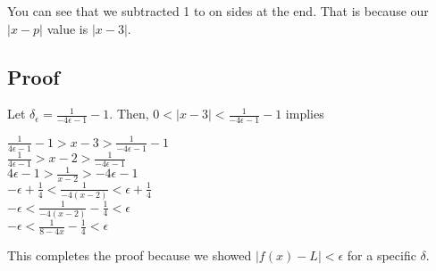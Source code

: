 \documentclass{article}
\newcommand\abs[1]{\left|#1\right|}
\begin{document}
\begin{flushleft}
\begin{enumerate}[(a)]
You can see that we subtracted 1 to on sides at the end. That is because our $\abs{x-p}$ value is $\abs{x-3}$. \\

\subsection*{Proof}

Let $\delta_\epsilon = \frac{1}{-4\epsilon - 1} - 1$. Then, $0 < \abs{x-3} < \frac{1}{-4\epsilon - 1} - 1$ implies \\
\begin{center}
\vspace{.2cm}
$\frac{1}{4\epsilon - 1} - 1 > x - 3 > \frac{1}{-4\epsilon - 1} - 1$ \\
\vspace{.2cm}
$\frac{1}{4\epsilon- 1} > x - 2 > \frac{1}{-4\epsilon - 1}$ \\
\vspace{.2cm}
$4\epsilon - 1 > \frac{1}{x - 2} > -4\epsilon - 1$ \\
\vspace{.2cm}
$-\epsilon + \frac{1}{4} < \frac{1}{-4(x-2)} < \epsilon + \frac{1}{4}$ \\
\vspace{.2cm}
$-\epsilon < \frac{1}{-4(x-2)} - \frac{1}{4} < \epsilon$ \\
\vspace{.2cm}
$-\epsilon < \frac{1}{8-4x} - \frac{1}{4} < \epsilon$ \\
\end{center}

This completes the proof because we showed $\abs{f(x) - L} < \epsilon$ for a specific $\delta$. \\

\end{enumerate}
\end{flushleft}

\end{document}

